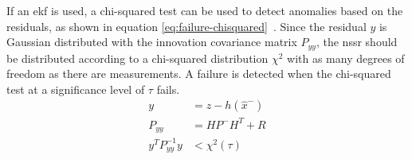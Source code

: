 If an \gls{ekf} is used, a chi-squared test can be used to detect anomalies based on the residuals, as shown in equation \ref{eq:failure-chisquared}~\cites[p.~4292]{Hausman.2016}[p.~2050~f.]{Valls.2018}. Since the residual $y$ is Gaussian distributed with the innovation covariance matrix $P_{yy}$, the \gls{nssr} should be distributed according to a chi-squared distribution $\chi^2$ with as many degrees of freedom as there are measurements. A failure is detected when the chi-squared test at a significance level of $\tau$ fails.
\begin{subequations}\label{eq:failure-chisquared}
\begin{alignat}{2}%
y &= z - h(\hat{x}^-) \\%
P_{yy} &= H P^- H^T + R \\%
y^T P_{yy}^{-1} y &< \chi^2(\tau)%
\end{alignat}
\end{subequations}

